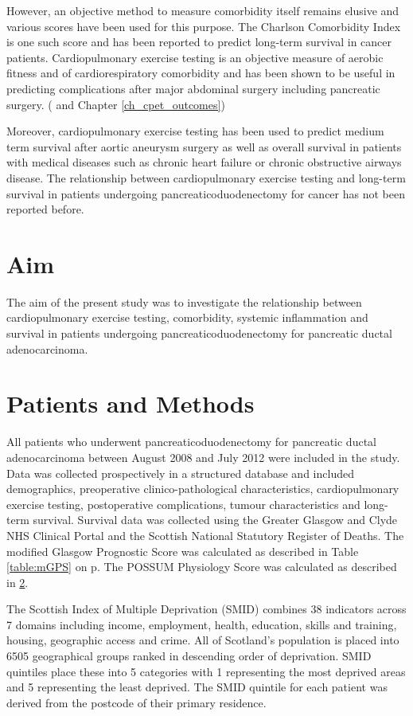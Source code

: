 However, an objective method to measure comorbidity itself remains elusive and various scores have been used for this purpose. The Charlson Comorbidity Index is one such score and has been reported to predict long-term survival in cancer patients. Cardiopulmonary exercise testing is an objective measure of aerobic fitness and of cardiorespiratory comorbidity and has been shown to be useful in predicting complications after major abdominal surgery including pancreatic surgery. (\parencite{ausania_effects_2012} and Chapter \ref{ch_cpet_outcomes})

Moreover, cardiopulmonary exercise testing has been used to predict medium term survival after aortic aneurysm surgery \parencite{carlisle_mid-term_2007} as well as overall survival in patients with medical diseases such as chronic heart failure or chronic obstructive airways disease. The relationship between cardiopulmonary exercise testing and long-term survival in patients undergoing pancreaticoduodenectomy for cancer has not been reported before. 

\section{Aim}
The aim of the present study was to investigate the relationship between cardiopulmonary exercise testing, comorbidity, systemic inflammation and survival in patients undergoing pancreaticoduodenectomy for pancreatic ductal adenocarcinoma.
\clearpage

\section{Patients and Methods}
All patients who underwent pancreaticoduodenectomy for pancreatic ductal adenocarcinoma between August 2008 and July 2012 were included in the study. Data was collected prospectively in a structured database and included demographics, preoperative clinico-pathological characteristics, cardiopulmonary exercise testing, postoperative complications, tumour characteristics and long-term survival. Survival data was collected using the Greater Glasgow and Clyde NHS Clinical Portal and the Scottish National Statutory Register of Deaths. The modified Glasgow Prognostic Score was calculated as described in Table \ref{table:mGPS} on p\pageref{table:mGPS}. The POSSUM Physiology Score was calculated as described in \ref{}. 

The Scottish Index of Multiple Deprivation (SMID) combines 38 indicators across 7 domains including  income, employment, health, education, skills and training, housing, geographic access and crime.  All of Scotland's population is placed into 6505 geographical groups ranked in descending order of deprivation. SMID quintiles place these into 5 categories with 1 representing the most deprived areas and 5 representing the least deprived. The SMID quintile for each patient was derived from the postcode of their primary residence.

